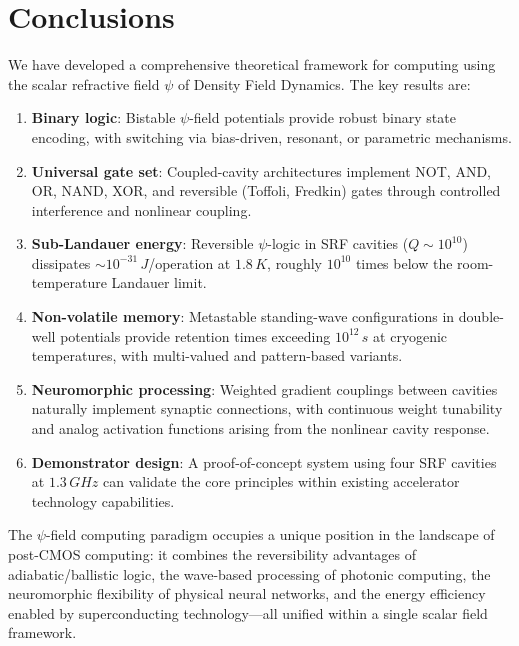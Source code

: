 \documentclass[12pt,a4paper,twoside]{article}
\begin{document}
\section{Conclusions}\label{sec:conclusions}

We have developed a comprehensive theoretical framework for computing using the scalar refractive field $\psi$ of Density Field Dynamics. The key results are:

\begin{enumerate}
\item \textbf{Binary logic}: Bistable $\psi$-field potentials provide robust binary state encoding, with switching via bias-driven, resonant, or parametric mechanisms.

\item \textbf{Universal gate set}: Coupled-cavity architectures implement NOT, AND, OR, NAND, XOR, and reversible (Toffoli, Fredkin) gates through controlled interference and nonlinear coupling.

\item \textbf{Sub-Landauer energy}: Reversible $\psi$-logic in SRF cavities ($Q \sim 10^{10}$) dissipates $\sim 10^{-31}\,\si{J}$/operation at $1.8\,\si{K}$, roughly $10^{10}$ times below the room-temperature Landauer limit.

\item \textbf{Non-volatile memory}: Metastable standing-wave configurations in double-well potentials provide retention times exceeding $10^{12}\,\si{s}$ at cryogenic temperatures, with multi-valued and pattern-based variants.

\item \textbf{Neuromorphic processing}: Weighted gradient couplings between cavities naturally implement synaptic connections, with continuous weight tunability and analog activation functions arising from the nonlinear cavity response.

\item \textbf{Demonstrator design}: A proof-of-concept system using four SRF cavities at $1.3\,\si{GHz}$ can validate the core principles within existing accelerator technology capabilities.
\end{enumerate}

The $\psi$-field computing paradigm occupies a unique position in the landscape of post-CMOS computing: it combines the reversibility advantages of adiabatic/ballistic logic, the wave-based processing of photonic computing, the neuromorphic flexibility of physical neural networks, and the energy efficiency enabled by superconducting technology---all unified within a single scalar field framework.
\end{document}
